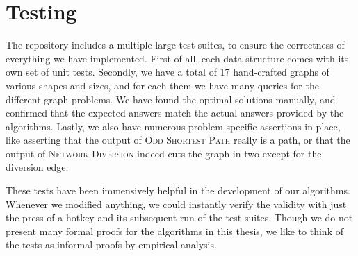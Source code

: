\section{Testing}
The repository includes a multiple large test suites, to ensure the correctness of everything we have implemented. First of all, each data structure comes with its own set of unit tests. Secondly, we have a total of 17 hand-crafted graphs of various shapes and sizes, and for each them we have many queries for the different graph problems. We have found the optimal solutions manually, and confirmed that the expected answers match the actual answers provided by the algorithms. Lastly, we also have numerous problem-specific assertions in place, like asserting that the output of \textsc{Odd Shortest Path} really is a path, or that the output of \textsc{Network Diversion} indeed cuts the graph in two except for the diversion edge.

These tests have been immensively helpful in the development of our algorithms. Whenever we modified anything, we could instantly verify the validity with just the press of a hotkey and its subsequent run of the test suites. Though we do not present many formal proofs for the algorithms in this thesis, we like to think of the tests as informal proofs by empirical analysis.